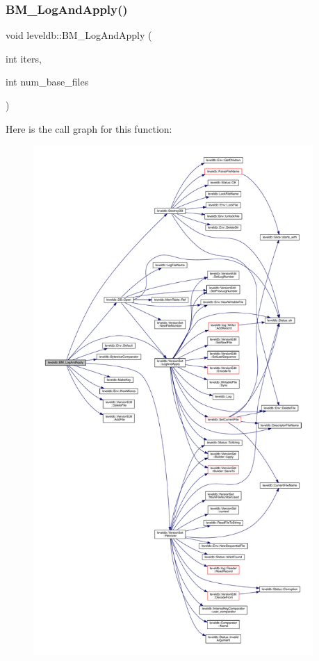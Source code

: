 \subsubsection{\texorpdfstring{BM\_LogAndApply()}{BM\_LogAndApply()}}
{\footnotesize\ttfamily void leveldb\+::\+B\+M\+\_\+\+Log\+And\+Apply (\begin{DoxyParamCaption}\item[{int}]{iters,  }\item[{int}]{num\+\_\+base\+\_\+files }\end{DoxyParamCaption})}

Here is the call graph for this function\+:
\nopagebreak
\begin{figure}[H]
\begin{center}
\leavevmode
\includegraphics[height=550pt]{namespaceleveldb_af9cf6ec167c9b6f25fd050ab6fb67a90_cgraph}
\end{center}
\end{figure}
